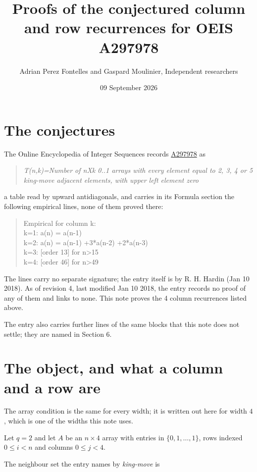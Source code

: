 \documentclass[11pt]{article}
\title{Proofs of the conjectured column and row recurrences for OEIS A297978}
\author{Adrian Perez Fontelles and Gaspard Moulinier, Independent researchers}
\date{09 September 2026}
\theoremstyle{definition}
\begin{document}
\maketitle
\section{The conjectures}

The Online Encyclopedia of Integer Sequences records \href{https://oeis.org/A297978}{A297978} as

\begin{quote}\itshape T(n,k)=Number of nXk 0..1 arrays with every element equal to 2, 3, 4 or 5 king-move adjacent elements, with upper left element zero\end{quote}

a table read by upward antidiagonals, and carries in its Formula section the following empirical lines, none of them proved there:

\begin{quote}\ttfamily Empirical for column k:\\
k=1: a(n) = a(n-1)\\k=2: a(n) = a(n-1) +3*a(n-2) +2*a(n-3)\\k=3: [order 13] for n>15\\k=4: [order 46] for n>49\end{quote}

The lines carry no separate signature; the entry itself is by R. H. Hardin (Jan 10 2018). As of revision 4, last modified Jan 10 2018, the entry records no proof of any of them and links to none. This note proves the 4 column recurrences listed above.

The entry also carries further lines of the same blocks that this note does not settle; they are named in Section 6.

\section{The object, and what a column and a row are}

The array condition is the same for every width; it is written out here for width $4$, which is one of the widths this note uses.

Let $q = 2$ and let $A$ be an $n \times 4$ array with entries in $\{0,1,\dots,1\}$, rows indexed $0 \le i < n$ and columns $0 \le j < 4$.

The neighbour set the entry names by {\itshape king-move} is
\end{document}
